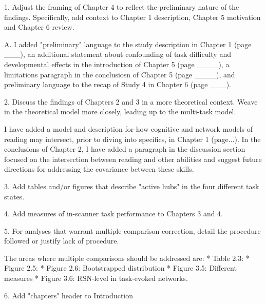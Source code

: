 1. Adjust the framing of Chapter 4 to reflect the preliminary nature of the findings. Specifically, add context to Chapter 1 description, Chapter 5 motivation and Chapter 6 review.

A. I added "preliminary" language to the study description in Chapter 1 (page ___), an additional statement about confounding of task difficulty and developmental effects in the introduction of Chapter 5 (page ____), a limitations paragraph in the conclusiosn of Chapter 5 (page ____), and preliminary language to the recap of Study 4 in Chapter 6 (page ___).

2. Discuss the findings of Chapters 2 and 3 in a more theoretical context. Weave in the theoretical model more closely, leading up to the multi-task model.

I have added a model and description for how cognitive and network models of reading may intersect, prior to diving into specifics, in Chapter 1 (page...). In the conclusions of Chapter 2, I have added a paragraph in the discussion section focused on the intersection between reading and other abilities and suggest future directions for addressing the covariance between these skills. 

3. Add tables and/or figures that describe "active hubs" in the four different task states.

4. Add measures of in-scanner task performance to Chapters 3 and 4.

5. For analyses that warrant multiple-comparison correction, detail the procedure followed or justify lack of procedure.

The areas where multiple comparisons should be addressed are: 
* Table 2.3: 
* Figure 2.5:
* Figure 2.6: Bootstrapped distribution
* Figure 3.5: Different measures
* Figure 3.6: RSN-level in task-evoked networks.


6. Add "chapters" header to Introduction